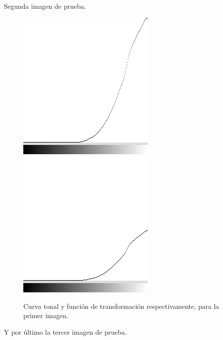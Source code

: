 \documentclass[conference]{IEEEtran}
\begin{document}
Segunda imagen de prueba.
\begin{figure}[h]
	\begin{center}
		\setlength{\unitlength}{0.00105in}
		\includegraphics[scale=0.50]{./images/Ha2_1.png}
		\includegraphics[scale=0.50]{./images/Ha2_2.png}
	\end{center}
	\caption{Curva tonal y funci\'on de transformaci\'on respectivamente, para la primer imagen.}
\end{figure}
\newpage
Y por \'ultimo la tercer imagen de prueba.
\end{document}
